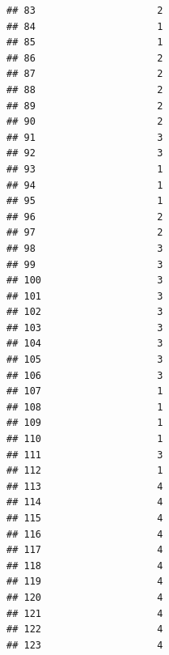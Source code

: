\documentclass[
]{article}
\begin{document}
\begin{verbatim}
## 83                     2
## 84                     1
## 85                     1
## 86                     2
## 87                     2
## 88                     2
## 89                     2
## 90                     2
## 91                     3
## 92                     3
## 93                     1
## 94                     1
## 95                     1
## 96                     2
## 97                     2
## 98                     3
## 99                     3
## 100                    3
## 101                    3
## 102                    3
## 103                    3
## 104                    3
## 105                    3
## 106                    3
## 107                    1
## 108                    1
## 109                    1
## 110                    1
## 111                    3
## 112                    1
## 113                    4
## 114                    4
## 115                    4
## 116                    4
## 117                    4
## 118                    4
## 119                    4
## 120                    4
## 121                    4
## 122                    4
## 123                    4
\end{verbatim}
\end{document}
